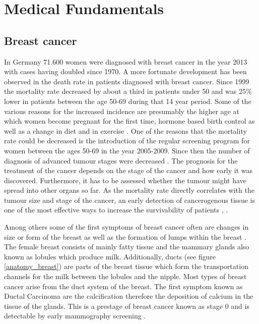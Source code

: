 \chapter{Medical Fundamentals}
\label{chap:medFund}




\section{Breast cancer}
\label{sec:breastcancer}

In Germany 71.600 women were diagnosed with breast cancer in the year 2013 with cases having doubled since 1970. A more fortunate development has been observed in the death rate in patients diagnosed with breast cancer. Since 1999 the mortality rate decreased by about a third in patients under 50 and was 25\% lower in patients between the age 50-69 during that 14 year period.
Some of the various reasons for the increased incidence are presumably the higher age at which women become pregnant for the first time, hormone based birth control as well as a change in diet and in exercise \cite{RobertKoch-Institut2016Bericht2016}.
One of the reasons that the mortality rate could be decreased is the introduction of the regular screening program for women between the ages 50-69 in the year 2005-2009. Since then the number of diagnosis of advanced tumour stages were decreased \cite{RobertKoch-Institut2016Bericht2016}. 
The prognosis for the treatment of the cancer depends on the stage of the cancer and how early it was discovered. Furthermore, it has to be assessed whether the tumour might have spread into other organs so far. As the mortality rate directly correlates with the tumour size and stage of the cancer, an early detection of cancerogenous tissue is one of the most effective ways to increase the survivability of patients \cite{Veronesi1985PrognosisNodes}, \cite{Welch2016Breast-CancerEffectiveness}.

Among others some of the first symptoms of breast cancer often are changes in size or form of the breast as well as the formation of lumps within the breast  \cite{NationalInstitutesofHealthNIH-NationalCancerInstituteNCIBreastTreatment}.
The female breast consists of mainly fatty tissue and the mammary glands also known as lobules which produce milk. Additionally, ducts (see figure \ref{anatomy_breast}) are parts of the breast tissue which form the transportation channels for the milk between the lobules and the nipple.
Most types of breast cancer arise from the duct system of the breast. The first symptom known as Ductal Carcinoma are the calcification therefore the deposition of calcium in the tissue of the glands.
This is a prestage of breast cancer known as stage 0 and is detectable by early mammography screening \cite{brestcancer_stages}.  


